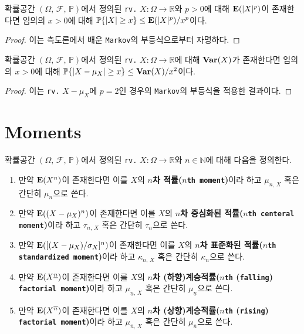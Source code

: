 \begin{theorem}
    확률공간 $(\Omega,\,\mathcal{F},\,\mathbb{P})$에서 정의된 \texttt{rv.} $X:\Omega\to\mathbb{R}$와 $p>0$에 대해 $\mathbf{E}(|X|^p)$이 존재한다면 임의의 $x>0$에 대해 $\mathbb{P}\{|X|\geq x\}\leq\mathbf{E}(|X|^p)/x^p$이다.
\end{theorem}

\begin{proof}
    이는 측도론에서 배운 \texttt{Markov}의 부등식으로부터 자명하다.
\end{proof}

\begin{corollary}
    확률공간 $(\Omega,\,\mathcal{F},\,\mathbb{P})$에서 정의된 \texttt{rv.} $X:\Omega\to\mathbb{R}$에 대해 $\mathbf{Var}(X)$가 존재한다면 임의의 $x>0$에 대해 $\mathbb{P}\{|X-\mu_X|\geq x\}\leq\mathbf{Var}(X)/x^2$이다.
\end{corollary}

\begin{proof}
    이는 \texttt{rv.} $X-\mu_X$에 $p=2$인 경우의 \texttt{Markov}의 부등식을 적용한 결과이다.
\end{proof}

\section{Moments}

\begin{definition}
    확률공간 $(\Omega,\,\mathcal{F},\,\mathbb{P})$에서 정의된 \texttt{rv.} $X:\Omega\to\mathbb{R}$와 $n\in\mathbb{N}$에 대해 다음을 정의한다.
    \begin{enumerate}
        \item 만약 $\mathbf{E}(X^n)$이 존재한다면 이를 $X$의 \textbf{$n$차 적률($n$\texttt{th moment})}이라 하고 $\mu_{n,\,X}$ 혹은 간단히 $\mu_n$으로 쓴다.
        \item 만약 $\mathbf{E}((X-\mu_X)^n)$이 존재한다면 이를 $X$의 \textbf{$n$차 중심화된 적률($n$\texttt{th centeral moment})}이라 하고 $\tau_{n,\,X}$ 혹은 간단히 $\tau_n$으로 쓴다.
        \item 만약 $\mathbf{E}([(X-\mu_X)/\sigma_X]^n)$이 존재한다면 이를 $X$의 \textbf{$n$차 표준화된 적률($n$\texttt{th standardized moment})}이라 하고 $\kappa_{n,\,X}$ 혹은 간단히 $\kappa_n$으로 쓴다.
        \item 만약 $\mathbf{E}(X^{\underline{n}})$이 존재한다면 이를 $X$의 \textbf{$n$차 (하향)계승적률($n$\texttt{th} (\texttt{falling}) \texttt{factorial moment})}이라 하고 $\mu_{\underline{n},\,X}$ 혹은 간단히 $\mu_{\underline{n}}$으로 쓴다.
        \item 만약 $\mathbf{E}(X^{\overline{n}})$이 존재한다면 이를 $X$의 \textbf{$n$차 (상향)계승적률($n$\texttt{th} (\texttt{rising}) \texttt{factorial moment})}이라 하고 $\mu_{\overline{n},\,X}$ 혹은 간단히 $\mu_{\overline{n}}$으로 쓴다.
    \end{enumerate}
\end{definition}

